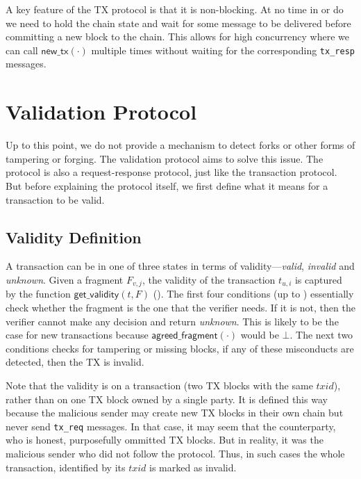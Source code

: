 A key feature of the TX protocol is that it is non-blocking.
At no time in  or  do we need to hold the chain state and wait for some message to be delivered before committing a new block to the chain.
This allows for high concurrency where we can call $\textsf{new\_tx}(\cdot)$ multiple times without waiting for the corresponding \texttt{tx\_resp} messages.

\section{Validation Protocol}
\label{sec:vd-protocol}

Up to this point, we do not provide a mechanism to detect forks or other forms of tampering or forging.
The validation protocol aims to solve this issue.
The protocol is also a request-response protocol, just like the transaction protocol.
But before explaining the protocol itself, we first define what it means for a transaction to be valid.

\subsection{Validity Definition}
A transaction can be in one of three states in terms of validity---\emph{valid}, \emph{invalid} and \emph{unknown}.
Given a fragment $F_{v, j}$, the validity of the transaction $t_{u, i}$ is captured by the function $\textsf{get\_validity}(t, F)$ ().
The first four conditions (up to ) essentially check whether the fragment is the one that the verifier needs.
If it is not, then the verifier cannot make any decision and return \emph{unknown}.
This is likely to be the case for new transactions because $\textsf{agreed\_fragment}(\cdot)$ would be $\bot$.
The next two conditions checks for tampering or missing blocks, if any of these misconducts are detected, then the TX is invalid.

Note that the validity is on a transaction (two TX blocks with the same $txid$), rather than on one TX block owned by a single party.
It is defined this way because the malicious sender may create new TX blocks in their own chain but never send \texttt{tx\_req} messages.
In that case, it may seem that the counterparty, who is honest, purposefully ommitted TX blocks.
But in reality, it was the malicious sender who did not follow the protocol.
Thus, in such cases the whole transaction, identified by its $txid$ is marked as invalid.

